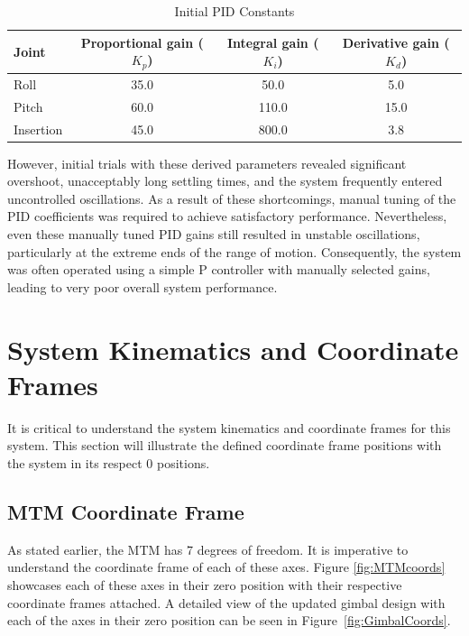 \begin{table}[h!]
    \centering
    \caption{Initial PID Constants}
    \label{tab:pid_constants}
    \begin{tabular}{lccc}
        \toprule
        \textbf{Joint} & \textbf{Proportional gain ($K_p$)} & \textbf{Integral gain ($K_i$)} & \textbf{Derivative gain ($K_d$)} \\
        \midrule
        Roll & 35.0 & 50.0 & 5.0 \\
        Pitch & 60.0 & 110.0 & 15.0 \\
        Insertion & 45.0 & 800.0 & 3.8 \\
        \bottomrule
    \end{tabular}
\end{table}

However, initial trials with these derived parameters revealed significant overshoot, unacceptably long settling times, and the system frequently entered uncontrolled oscillations. As a result of these shortcomings, manual tuning of the PID coefficients was required to achieve satisfactory performance. Nevertheless, even these manually tuned PID gains still resulted in unstable oscillations, particularly at the extreme ends of the range of motion. Consequently, the system was often operated using a simple P controller with manually selected gains, leading to very poor overall system performance.


\section{System Kinematics and Coordinate Frames}

It is critical to understand the system kinematics and coordinate frames for this system. This section will illustrate the defined coordinate frame positions with the system in its respect 0 positions. 

\subsection{MTM Coordinate Frame}

As stated earlier, the MTM has 7 degrees of freedom. It is imperative to understand the coordinate frame of each of these axes. Figure \ref{fig:MTMcoords} showcases each of these axes in their zero position with their respective coordinate frames attached. A detailed view of the updated gimbal design with each of the axes in their zero position can be seen in Figure~\ref{fig:GimbalCoords}.

